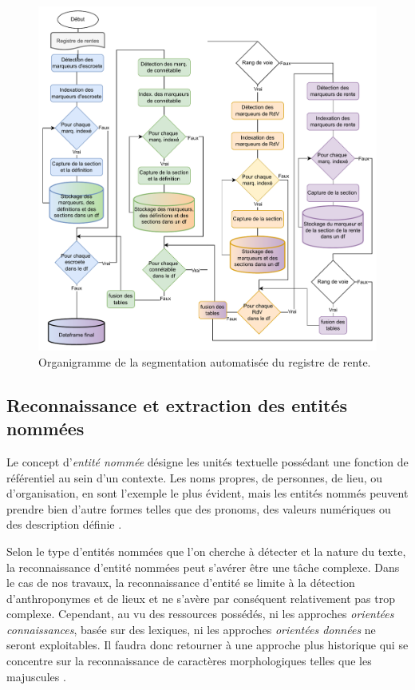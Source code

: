 \begin{figure}[ht] %
    \centering
    \includegraphics[scale=0.75]{2.Methods/Img/seg.drawio.pdf} 
    \caption{Organigramme de la segmentation automatisée du registre de rente.}
\end{figure}


\subsection{Reconnaissance et extraction des entités nommées}

Le concept d'\textit{entité nommée} désigne les unités textuelle possédant une fonction de référentiel au sein d'un contexte. Les noms propres, de personnes, de lieu, ou d'organisation, en sont l'exemple le plus évident, mais les entités nommés peuvent prendre bien d'autre formes telles que des pronoms, des valeurs numériques ou des description définie \parencite{omrane_les_2010,nadeau_survey_2007}.

Selon le type d'entités nommées que l'on cherche à détecter et la nature du texte, la reconnaissance d'entité nommées peut s'avérer être une tâche complexe. Dans le cas de nos travaux, la reconnaissance d'entité se limite à la détection d'anthroponymes et de lieux et ne s'avère par conséquent relativement pas trop complexe. Cependant, au vu des ressources possédés, ni les approches \textit{orientées connaissances}, basée sur des lexiques, ni les approches \textit{orientées données} ne seront exploitables. Il faudra donc retourner à une  approche plus historique qui se concentre sur la reconnaissance de caractères morphologiques telles que les majuscules \parencite{nouvel_reconnaissance_2012}. 

